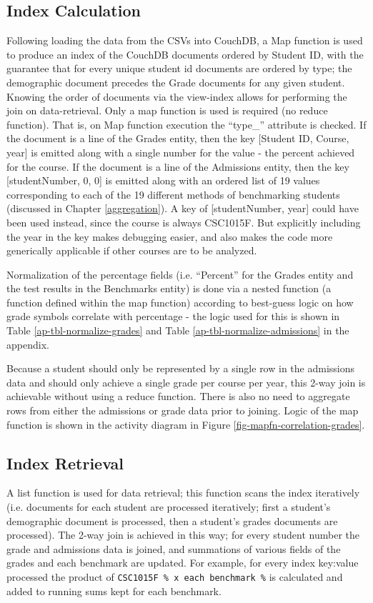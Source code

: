 \subsection{Index Calculation}
Following loading the data from the CSVs into CouchDB, a Map function is used to produce an index of the CouchDB documents ordered by Student ID, with the guarantee that for every unique student id documents are ordered by type; the demographic document precedes the Grade documents for any given student. Knowing the order of documents via the view-index allows for performing the join on data-retrieval. Only a map function is used is required (no reduce function). That is, on Map function execution the ``type\_'' attribute is checked. If the document is a line of the Grades entity, then the key [Student ID, Course, year] is emitted along with a single number for the value - the percent achieved for the course. If the document is a line of the Admissions entity, then the key [studentNumber, 0, 0] is emitted along with an ordered list of 19 values corresponding to each of the 19 different methods of benchmarking students (discussed in Chapter \ref{aggregation}). A key of [studentNumber, year] could have been used instead, since the course is always CSC1015F. But explicitly including the year in the key makes debugging easier, and also makes the code more generically applicable if other courses are to be analyzed.

Normalization of the percentage fields (i.e. ``Percent'' for the Grades entity and the test results in the Benchmarks entity) is done via a nested function (a function defined within the map function) according to best-guess logic on how grade symbols correlate with percentage - the logic used for this is shown in Table \ref{ap-tbl-normalize-grades} and Table \ref{ap-tbl-normalize-admissions} in the appendix.

Because a student should only be represented by a single row in the admissions data and should only achieve a single grade per course per year, this 2-way join is achievable without using a reduce function. There is also no need to aggregate rows from either the admissions or grade data prior to joining. Logic of the map function is shown in the activity diagram in Figure \ref{fig-mapfn-correlation-grades}.



\subsection{Index Retrieval}
A list function is used for data retrieval; this function scans the index iteratively (i.e. documents for each student are processed iteratively; first a student's demographic document is processed, then a student's grades documents are processed). The 2-way join is achieved in this way; for every student number the grade and admissions data is joined, and summations of various fields of the grades and each benchmark are updated. For example, for every index key:value processed the product of \texttt{CSC1015F \% x each benchmark \%} is calculated and added to running sums kept for each benchmark.

